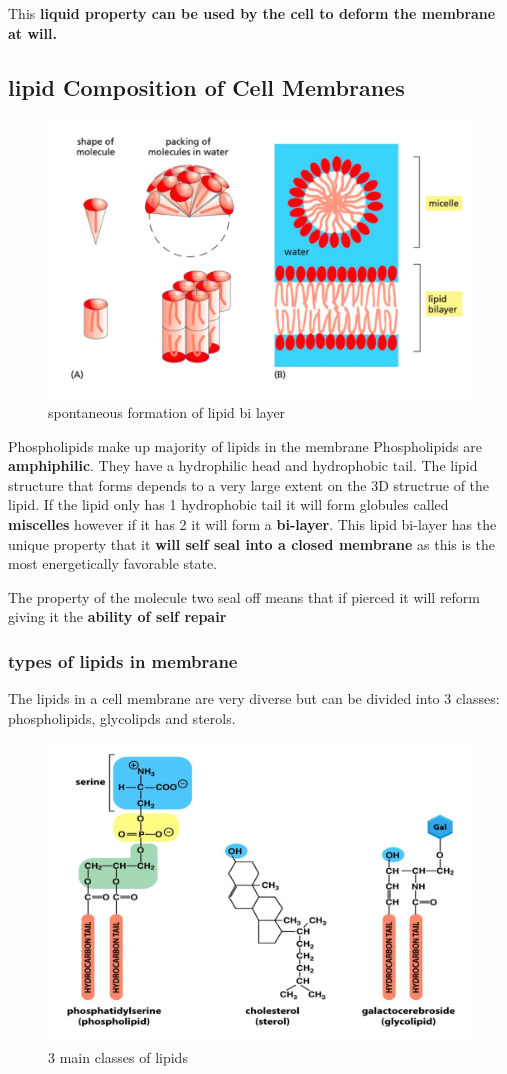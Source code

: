 \documentclass[../main.tex]{subfiles}
\begin{document}
        This \textbf{liquid property can be used by the cell to deform the membrane at will.}

        \subsection{lipid Composition of Cell Membranes}
        \begin{figure}[H]
            \centering
            \includegraphics[width=0.5\linewidth]{biLayer.png}
            \caption{spontaneous formation of lipid bi layer}
            \label{fig:bilayer}
        \end{figure}
        Phospholipids make up majority of lipids in the membrane Phospholipids are \textbf{amphiphilic}. They have a hydrophilic head and hydrophobic tail. The lipid structure that forms depends to a very large extent on the 3D structrue of the lipid. If the lipid only has 1 hydrophobic tail it will form globules called \textbf{miscelles} however if it has 2 it will form a \textbf{bi-layer}. This lipid bi-layer has the unique property that it \textbf{will self seal into a closed membrane} as this is the most energetically favorable state. 

        \begin{remark}
            The property of the molecule two seal off means that if pierced it will reform giving it the \textbf{ability of self repair}
        \end{remark}

        \subsubsection{types of lipids in membrane}
        The lipids in a cell membrane are very diverse but can be divided into 3 classes: phospholipids, glycolipds and sterols.
            \begin{figure}[H]
                \centering
                \includegraphics[width=0.6\linewidth]{typesLipids.png}
                \caption{3 main classes of lipids}
                \label{fig:lipids}
            \end{figure}
            
\end{document}

